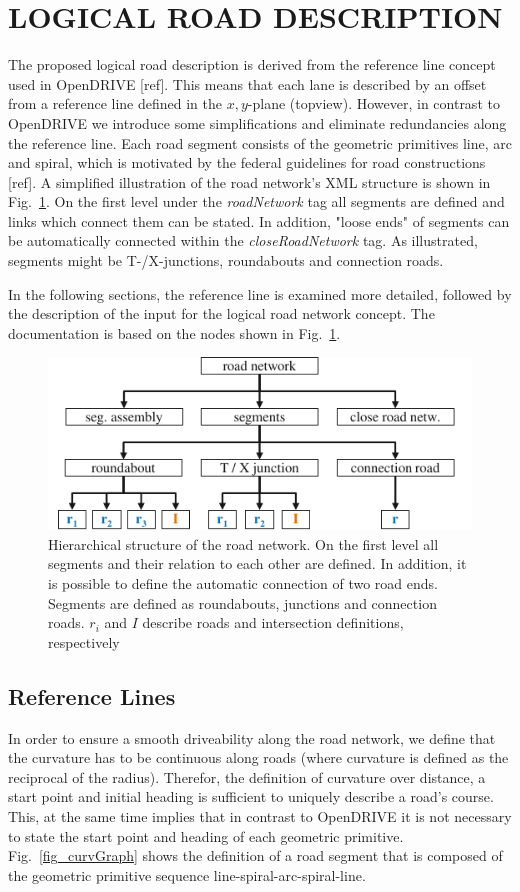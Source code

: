 \documentclass[a4paper, 10pt, conference]{ieeeconf}      %
\begin{document}
\section{LOGICAL ROAD DESCRIPTION}
The proposed logical road description is derived from the reference line concept used in OpenDRIVE [ref]. This means that each lane is described by an offset from a reference line defined in the $x,y$-plane (topview). However, in contrast to OpenDRIVE we introduce some simplifications and eliminate redundancies along the reference line. Each road segment consists of the geometric primitives line, arc and spiral, which is motivated by the federal guidelines for road constructions [ref]. A simplified illustration of the road network's XML structure is shown in Fig.~\ref{fig_schema}. On the first level under the \textit{roadNetwork} tag all segments are defined and links which connect them can be stated. In addition, "loose ends" of segments can be automatically connected within the \textit{closeRoadNetwork} tag. As illustrated, segments might be T-/X-junctions, roundabouts and connection roads. 

In the following sections, the reference line is examined more detailed, followed by the description of the input for the logical road network concept. The documentation is based on the nodes shown in Fig.~\ref{fig_schema}. 
\begin{figure}[thpb] 		
	\centering
	\includegraphics{fig/schema.pdf}
	\caption{Hierarchical structure of the road network. On the first level all segments and their relation to each other are defined. In addition, it is possible to define the automatic connection of two road ends. Segments are defined as roundabouts, junctions and connection roads. $r_i$ and $I$ describe roads and intersection definitions, respectively}
	\label{fig_schema}
\end{figure}
\subsection{Reference Lines} \label{sec_refline} %
In order to ensure a smooth driveability along the road network, we define that the curvature has to be continuous along roads (where curvature is defined as the reciprocal of the radius). Therefor, the definition of curvature over distance, a start point and initial heading is sufficient to uniquely describe a road's course. This, at the same time implies that in contrast to OpenDRIVE it is not necessary to state the start point and heading of each geometric primitive. Fig.~\ref{fig_curvGraph} shows the definition of a road segment that is composed of the geometric primitive sequence line-spiral-arc-spiral-line.
\end{document}
